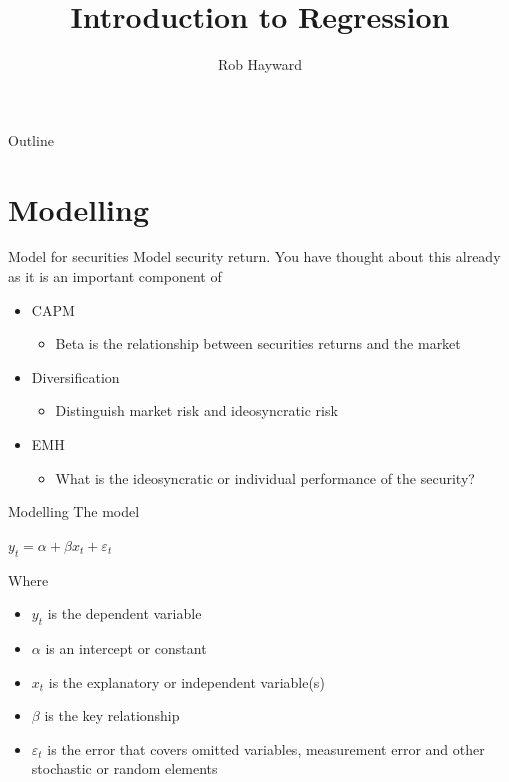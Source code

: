 \documentclass[14pt,xcolor=pdftex,dvipsnames,table]{beamer}\usepackage[]{graphicx}\usepackage[]{color}
\title{Introduction to Regression}
\author{Rob Hayward}
\begin{document}
\begin{frame}
\titlepage
\end{frame}

\begin{frame}{Outline}
\tableofcontents
\end{frame}


\section{Modelling}
\begin{frame}{Model for securities}
Model security return.  You have thought about this already as it is an important component of 
\begin{itemize}[<+-| alert@+>]
\item  CAPM
\begin{itemize}
\item Beta is the relationship between securities returns and the market
\end{itemize}
\item Diversification
\begin{itemize}
\item Distinguish market risk and ideosyncratic risk
\end{itemize}
\item EMH
\begin{itemize}
\item What is the ideosyncratic or individual performance of the security?
\end{itemize}
\end{itemize}
\end{frame}



\begin{frame}{Modelling}
The model
\begin{block}{}
$y_t = \alpha + \beta x_t + \varepsilon_t$
\end{block}
\pause
Where 
\begin{itemize}[<+-| alert@+>]
\item $y_t$ is the dependent variable
\item $\alpha$ is an intercept or constant
\item $x_t$ is the explanatory or independent variable(s)
\item $\beta$ is the key relationship
\item $\varepsilon_t$ is the error that covers omitted variables, measurement error and other stochastic or random elements
\end{itemize}
\end{frame}
\end{document}
